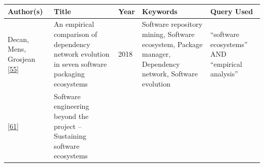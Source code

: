 \documentclass[]{book}
\begin{document}
\begin{longtable}[]{@{}lllll@{}}
\toprule
\begin{minipage}[b]{0.05\columnwidth}\raggedright\strut
Author(s)\strut
\end{minipage} & \begin{minipage}[b]{0.31\columnwidth}\raggedright\strut
Title\strut
\end{minipage} & \begin{minipage}[b]{0.02\columnwidth}\raggedright\strut
Year\strut
\end{minipage} & \begin{minipage}[b]{0.34\columnwidth}\raggedright\strut
Keywords\strut
\end{minipage} & \begin{minipage}[b]{0.13\columnwidth}\raggedright\strut
Query Used\strut
\end{minipage}\tabularnewline
\midrule
\endhead
\begin{minipage}[t]{0.05\columnwidth}\raggedright\strut
Decan, Mens, Grosjean {[}\protect\hyperlink{ref-Decan2018}{55}{]}\strut
\end{minipage} & \begin{minipage}[t]{0.31\columnwidth}\raggedright\strut
An empirical comparison of dependency network evolution in seven
software packaging ecosystems\strut
\end{minipage} & \begin{minipage}[t]{0.02\columnwidth}\raggedright\strut
2018\strut
\end{minipage} & \begin{minipage}[t]{0.34\columnwidth}\raggedright\strut
Software repository mining, Software ecosystem, Package manager,
Dependency network, Software evolution\strut
\end{minipage} & \begin{minipage}[t]{0.13\columnwidth}\raggedright\strut
``software ecosystems'' AND ``empirical analysis''\strut
\end{minipage}\tabularnewline
\begin{minipage}[t]{0.05\columnwidth}\raggedright\strut
{[}\protect\hyperlink{ref-Dittrich2014}{61}{]}\strut
\end{minipage} & \begin{minipage}[t]{0.31\columnwidth}\raggedright\strut
Software engineering beyond the project -- Sustaining software
ecosystems\strut
\end{minipage} & \begin{minipage}[t]{0.02\columnwidth}\raggedright\strut

\end{minipage}
\end{longtable}
\end{document}
